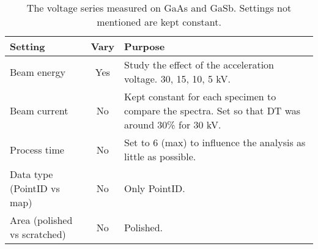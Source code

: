 \begin{table}[hbtp]
    \begin{center}
        \caption{
            The voltage series measured on GaAs and GaSb.
            Settings not mentioned are kept constant.
        }
        \renewcommand*{\arraystretch}{1.4}
        \label{tab:method:acquisition_settings:voltage}
        \begin{tabular}{p{4cm}cp{8cm}}
            \hline
            \textbf{Setting}             & \textbf{Vary} & \textbf{Purpose}                                                                                  \\
            \hline
            Beam energy                  & Yes           & Study the effect of the acceleration voltage. 30, 15, 10, 5 kV.                                   \\
            Beam current                 & No            & Kept constant for each specimen to compare the spectra. Set so that DT was around 30\% for 30 kV. \\
            Process time                 & No            & Set to 6 (max) to influence the analysis as little as possible.                                   \\
            Data type (PointID vs map)   & No            & Only PointID.                                                                                     \\
            Area (polished vs scratched) & No            & Polished.                                                                                         \\
            \hline
        \end{tabular}
    \end{center}
\end{table}
